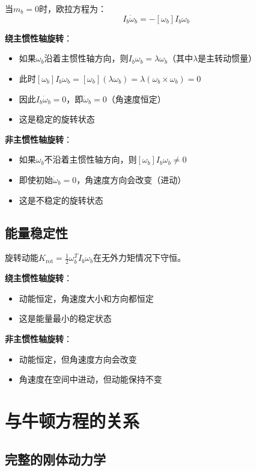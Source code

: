 \documentclass[12pt,a4paper]{article}
\begin{document}
当$m_b = 0$时，欧拉方程为：
\begin{equation}
I_b \dot{\omega}_b = -[\omega_b] I_b \omega_b
\end{equation}

\textbf{绕主惯性轴旋转}：
\begin{itemize}
\item 如果$\omega_b$沿着主惯性轴方向，则$I_b \omega_b = \lambda \omega_b$（其中$\lambda$是主转动惯量）
\item 此时$[\omega_b] I_b \omega_b = [\omega_b] (\lambda \omega_b) = \lambda (\omega_b \times \omega_b) = 0$
\item 因此$I_b \dot{\omega}_b = 0$，即$\dot{\omega}_b = 0$（角速度恒定）
\item 这是稳定的旋转状态
\end{itemize}

\textbf{非主惯性轴旋转}：
\begin{itemize}
\item 如果$\omega_b$不沿着主惯性轴方向，则$[\omega_b] I_b \omega_b \neq 0$
\item 即使初始$\dot{\omega}_b = 0$，角速度方向会改变（进动）
\item 这是不稳定的旋转状态
\end{itemize}

\subsection{能量稳定性}

旋转动能$K_{\text{rot}} = \frac{1}{2} \omega_b^T I_b \omega_b$在无外力矩情况下守恒。

\textbf{绕主惯性轴旋转}：
\begin{itemize}
\item 动能恒定，角速度大小和方向都恒定
\item 这是能量最小的稳定状态
\end{itemize}

\textbf{非主惯性轴旋转}：
\begin{itemize}
\item 动能恒定，但角速度方向会改变
\item 角速度在空间中进动，但动能保持不变
\end{itemize}

\section{与牛顿方程的关系}

\subsection{完整的刚体动力学}
\end{document}
